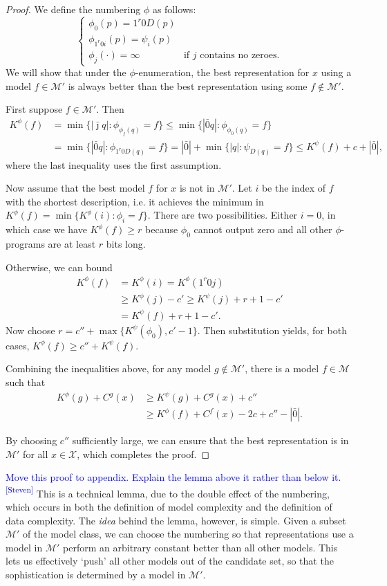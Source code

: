 \documentclass{style/llncs}
\newcommand{\M}{\mathscr M}
\newcommand{\X}{\mathscr X}
\newcommand{\sdr}[1]{\textcolor{blue}{\small #1\textsuperscript{[Steven]} }}
\begin{document}
\begin{proof}
We define the numbering $\phi$ as follows:
\[\begin{cases}
\phi_0(p) = 1^r 0 D(p) \\
\phi_{1^r0i}(p) = \psi_i(p) \\
\phi_j(\cdot) = \infty &\text{if $j$ contains no zeroes.}
\end{cases}\]
We will show that under the $\phi$-enumeration, the best representation for $x$ using a model $f\in\M'$ is always better than the best representation using some $f\not\in\M'$.

First suppose $f\in\M'$. Then
\begin{align*}
K^\phi(f) &=\min\{|\bar\jmath q|:\phi_{\phi_j(q)}=f\}
\leq\min\{|\bar0 q|:\phi_{\phi_0(q)}=f\} \\ 
&=\min\{|\bar0 q|:\phi_{1^r0 D(q)}=f\}  
=|\bar 0|+\min\{|q|:\psi_{D(q)}=f\}
\leq K^\psi(f)+c+|\bar 0|,
\end{align*}
where the last inequality uses the first assumption.

Now assume that the best model $f$ for $x$ is not in $\M'$. 
Let $i$ be the index of $f$ with the shortest description, i.e. it achieves the minimum in $K^\phi(f)=\min\{K^\phi(i):\phi_i=f\}$.
There are two possibilities. Either $i=0$, in which case we have $K^\phi(f)\ge r$ because $\phi_0$ cannot output zero and all other $\phi$-programs are at least $r$ bits long.

Otherwise, we can bound
\begin{align*}
K^\phi(f)&=K^\phi(i)=K^\phi(1^r0j)\\
&\ge K^\phi(j)-c' \ge K^\psi(j)+r+1-c'\\
&=K^\psi(f)+r+1-c'.
\end{align*}
Now choose $r=c''+\max\{K^\psi(\phi_0),c'-1\}$. Then substitution yields, for both cases, 
$K^\phi(f)\ge c''+K^\psi(f)$.

Combining the inequalities above, for any model $g\not\in\M'$, there is a model $f\in\M$ such that
\[\begin{split}
K^\phi(g)+C^g(x) &\ge K^\psi(g)+C^g(x)+c''\\
&\ge K^\phi(f)+C^f(x) -2c+c'' -|\bar0|.
\end{split}\]

By choosing $c''$ sufficiently large, we can ensure that the best representation is in $\M'$ for all $x\in\X$, which completes the proof.
\end{proof}

\sdr{Move this proof to appendix. Explain the lemma above it rather than below it.}
This is a technical lemma, due to the double effect of the numbering, which occurs in both the definition of model complexity and the definition of data complexity. The \emph{idea} behind the lemma, however, is simple. Given a subset $\M'$ of the model class, we can choose the numbering so that representations use a model in $\M'$ perform an arbitrary constant better than all other models. This lets us effectively `push' all other models out of the candidate set, so that the sophistication is determined by a model in $\M'$.
\end{document}
